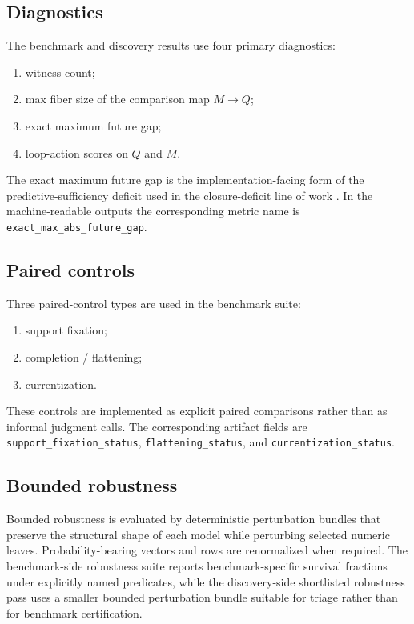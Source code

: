 \documentclass[11pt]{article}
\newcommand{\CurrentQ}{Q}
\newcommand{\PredictiveQ}{M}
\theoremstyle{definition}
\begin{document}
\subsection{Diagnostics}\label{appsubsec:comp-diagnostics}
The benchmark and discovery results use four primary diagnostics:
\begin{enumerate}
\item witness count;
\item max fiber size of the comparison map $\PredictiveQ \to \CurrentQ$;
\item exact maximum future gap;
\item loop-action scores on $\CurrentQ$ and $\PredictiveQ$.
\end{enumerate}
The exact maximum future gap is the implementation-facing form of the predictive-sufficiency deficit used in the closure-deficit line of work \citep{Tsiokos2026CastStone}. In the machine-readable outputs the corresponding metric name is \texttt{exact\_max\_abs\_future\_gap}.

\subsection{Paired controls}\label{appsubsec:comp-controls}
Three paired-control types are used in the benchmark suite:
\begin{enumerate}
\item support fixation;
\item completion / flattening;
\item currentization.
\end{enumerate}
These controls are implemented as explicit paired comparisons rather than as informal judgment calls. The corresponding artifact fields are \texttt{support\_fixation\_status}, \texttt{flattening\_status}, and \texttt{currentization\_status}.

\subsection{Bounded robustness}\label{appsubsec:comp-robustness}
Bounded robustness is evaluated by deterministic perturbation bundles that preserve the structural shape of each model while perturbing selected numeric leaves. Probability-bearing vectors and rows are renormalized when required. The benchmark-side robustness suite reports benchmark-specific survival fractions under explicitly named predicates, while the discovery-side shortlisted robustness pass uses a smaller bounded perturbation bundle suitable for triage rather than for benchmark certification.
\end{document}

